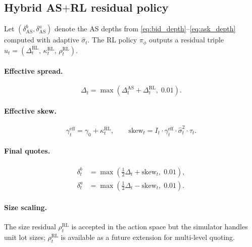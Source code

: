 \documentclass[11pt]{article}
\begin{document}
\subsection{Hybrid AS$+$RL residual policy}
\label{sec:residual}

Let $(\delta^b_{\text{AS}}, \delta^a_{\text{AS}})$ denote the AS depths
from \eqref{eq:bid_depth}--\eqref{eq:ask_depth} computed with adaptive
$\hat\sigma_t$.
The RL policy $\pi_\phi$ outputs a residual triple
$u_t = (\Delta^{\text{RL}}_t,\, \kappa^{\text{RL}}_t,\, \rho^{\text{RL}}_t)$.

\paragraph{Effective spread.}
\begin{equation}
  \Delta_t = \max\!\left(\Delta^{\text{AS}}_t + \Delta^{\text{RL}}_t,\; 0.01\right).
  \label{eq:eff_spread}
\end{equation}

\paragraph{Effective skew.}
\begin{equation}
  \gamma^{\text{eff}}_t = \gamma_0 + \kappa^{\text{RL}}_t,
  \qquad
  \mathrm{skew}_t = I_t \cdot \gamma^{\text{eff}}_t
    \cdot \hat\sigma_t^2 \cdot \tau_t.
  \label{eq:eff_skew}
\end{equation}

\paragraph{Final quotes.}
\begin{align}
  \delta^b_t &= \max\!\left(\tfrac{1}{2}\Delta_t + \mathrm{skew}_t,\; 0.01\right),
  \label{eq:final_bid} \\
  \delta^a_t &= \max\!\left(\tfrac{1}{2}\Delta_t - \mathrm{skew}_t,\; 0.01\right).
  \label{eq:final_ask}
\end{align}

\paragraph{Size scaling.}
The size residual $\rho^{\text{RL}}_t$ is accepted in the action space
but the simulator handles unit lot sizes; $\rho^{\text{RL}}_t$ is
available as a future extension for multi-level quoting.
\end{document}
